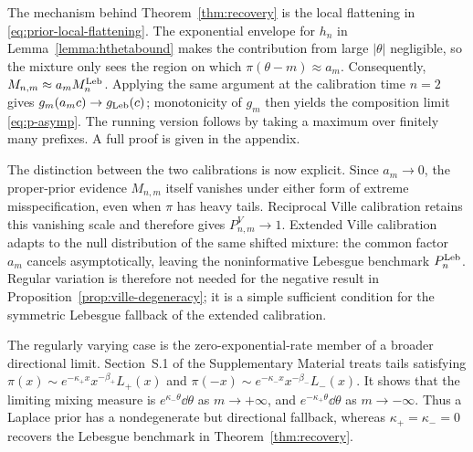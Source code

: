 The mechanism behind Theorem~\ref{thm:recovery} is the local
flattening in \eqref{eq:prior-local-flattening}.  The exponential
envelope for \(h_n\) in Lemma~\ref{lemma:hthetabound} makes the
contribution from large \(\lvert\theta\rvert\) negligible, so the
mixture only sees the region on which
\(\pi(\theta-m)\approx a_m\).  Consequently,
\(M_{n,m}\approx a_mM_n^{\mathrm{Leb}}\).  Applying the same argument at the
calibration time \(n=2\) gives
\(g_m(a_m c)\to g_{\mathrm{Leb}}(c)\); monotonicity of \(g_m\) then yields the
composition limit \eqref{eq:p-asymp}.  The running version follows by
taking a maximum over finitely many prefixes.  A full proof is given in
the appendix.

The distinction between the two calibrations is now explicit.  Since
\(a_m\to0\), the proper-prior evidence \(M_{n,m}\) itself vanishes
under either form of extreme misspecification, even when \(\pi\) has
heavy tails.  Reciprocal Ville calibration retains this vanishing
scale and therefore gives \(P_{n,m}^V\to1\).  Extended Ville
calibration adapts to the null distribution of the same shifted
mixture: the common factor \(a_m\) cancels asymptotically, leaving the
noninformative Lebesgue benchmark \(P_n^{\mathrm{Leb}}\).  Regular variation is
therefore not needed for the negative result in
Proposition~\ref{prop:ville-degeneracy}; it is a simple sufficient
condition for the symmetric Lebesgue fallback of the extended
calibration.

The regularly varying case is the zero-exponential-rate member of a
broader directional limit.  Section~S.1 of the Supplementary Material
treats tails satisfying
\(\pi(x)\sim e^{-\kappa_+x}x^{-\beta_+}L_+(x)\) and
\(\pi(-x)\sim e^{-\kappa_-x}x^{-\beta_-}L_-(x)\).  It shows that the
limiting mixing measure is \(e^{\kappa_-\theta}\dd\theta\) as
\(m\to+\infty\), and \(e^{-\kappa_+\theta}\dd\theta\) as
\(m\to-\infty\).  Thus a Laplace prior has a nondegenerate but
directional fallback, whereas \(\kappa_+=\kappa_-=0\) recovers the
Lebesgue benchmark in Theorem~\ref{thm:recovery}.